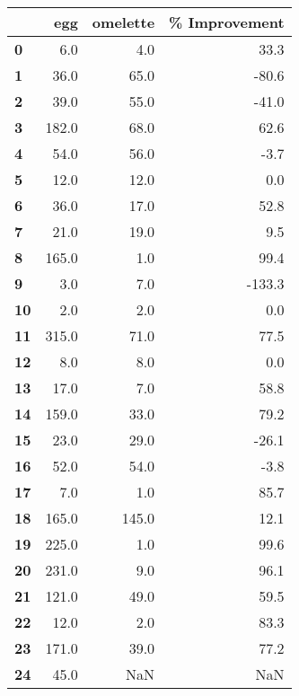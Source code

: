 \begin{tabular}{lrrr}
\toprule
{} &   egg &  omelette &  \% Improvement \\
\midrule
\textbf{0 } &   6.0 &       4.0 &           33.3 \\
\textbf{1 } &  36.0 &      65.0 &          -80.6 \\
\textbf{2 } &  39.0 &      55.0 &          -41.0 \\
\textbf{3 } & 182.0 &      68.0 &           62.6 \\
\textbf{4 } &  54.0 &      56.0 &           -3.7 \\
\textbf{5 } &  12.0 &      12.0 &            0.0 \\
\textbf{6 } &  36.0 &      17.0 &           52.8 \\
\textbf{7 } &  21.0 &      19.0 &            9.5 \\
\textbf{8 } & 165.0 &       1.0 &           99.4 \\
\textbf{9 } &   3.0 &       7.0 &         -133.3 \\
\textbf{10} &   2.0 &       2.0 &            0.0 \\
\textbf{11} & 315.0 &      71.0 &           77.5 \\
\textbf{12} &   8.0 &       8.0 &            0.0 \\
\textbf{13} &  17.0 &       7.0 &           58.8 \\
\textbf{14} & 159.0 &      33.0 &           79.2 \\
\textbf{15} &  23.0 &      29.0 &          -26.1 \\
\textbf{16} &  52.0 &      54.0 &           -3.8 \\
\textbf{17} &   7.0 &       1.0 &           85.7 \\
\textbf{18} & 165.0 &     145.0 &           12.1 \\
\textbf{19} & 225.0 &       1.0 &           99.6 \\
\textbf{20} & 231.0 &       9.0 &           96.1 \\
\textbf{21} & 121.0 &      49.0 &           59.5 \\
\textbf{22} &  12.0 &       2.0 &           83.3 \\
\textbf{23} & 171.0 &      39.0 &           77.2 \\
\textbf{24} &  45.0 &       NaN &            NaN \\
\bottomrule
\end{tabular}
